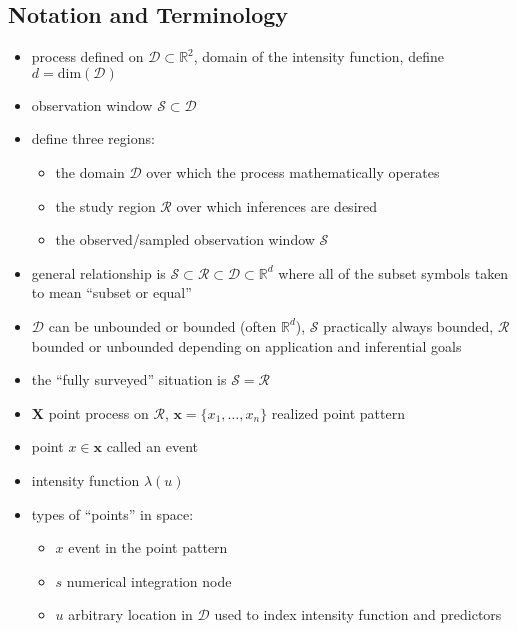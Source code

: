 \documentclass[12pt]{article}
\begin{document}
\subsection{Notation and Terminology}

\begin{itemize}

\item process defined on \(\mathcal{D} \subset \mathbb{R}^{2}\), domain of the
intensity function, define \(d = \mathrm{dim}(\mathcal{D})\)

\item observation window \(\mathcal{S} \subset \mathcal{D}\)

\item define three regions:
\begin{itemize}
\item the domain \(\mathcal{D}\) over which the process mathematically operates
\item the study region \(\mathcal{R}\) over which inferences are desired
\item the observed/sampled observation window \(\mathcal{S}\)
\end{itemize}

\item general relationship is \(\mathcal{S} \subset \mathcal{R}
\subset \mathcal{D} \subset \mathbb{R}^{d}\) where all of the subset symbols
taken to mean ``subset or equal''

\item \(\mathcal{D}\) can be unbounded or bounded (often \(\mathbb{R}^{d}\)),
$\mathcal{S}$ practically always bounded, \(\mathcal{R}\) bounded or unbounded
depending on application and inferential goals

\item the ``fully surveyed'' situation is \(\mathcal{S} = \mathcal{R}\)

\item \(\mathbf{X}\) point process on \(\mathcal{R}\), \(\mathbf{x} = \{x_{1},
\dots, x_{n}\}\) realized point pattern

\item point \(x \in \mathbf{x}\) called an event

\item intensity function \(\lambda(u)\)

\item types of ``points'' in space:
\begin{itemize}
\item \(x\) event in the point pattern
\item \(s\) numerical integration node
\item \(u\) arbitrary location in \(\mathcal{D}\) used to index intensity
function and predictors
\end{itemize}


\end{itemize}
\end{document}
